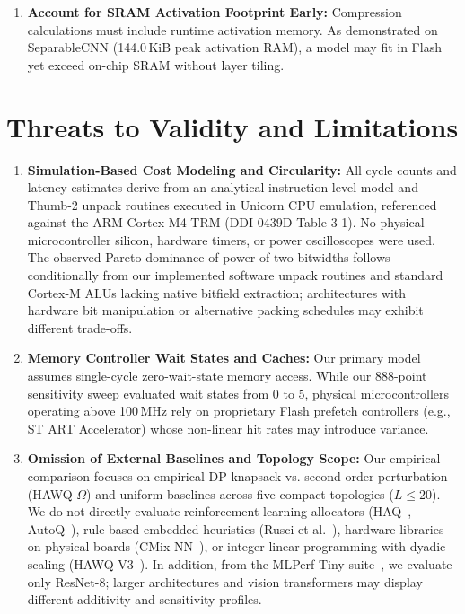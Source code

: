 \documentclass{ieeeaccess}
\begin{document}
\begin{enumerate}
    \item \textbf{Account for SRAM Activation Footprint Early:} Compression calculations must include runtime activation memory. As demonstrated on SeparableCNN (144.0\,KiB peak activation RAM), a model may fit in Flash yet exceed on-chip SRAM without layer tiling.
\end{enumerate}

\section{Threats to Validity and Limitations}
\label{sec:threats}
\begin{enumerate}
    \item \textbf{Simulation-Based Cost Modeling and Circularity:} All cycle counts and latency estimates derive from an analytical instruction-level model and Thumb-2 unpack routines executed in Unicorn CPU emulation, referenced against the ARM Cortex-M4 TRM (DDI 0439D Table 3-1). No physical microcontroller silicon, hardware timers, or power oscilloscopes were used. The observed Pareto dominance of power-of-two bitwidths follows conditionally from our implemented software unpack routines and standard Cortex-M ALUs lacking native bitfield extraction; architectures with hardware bit manipulation or alternative packing schedules may exhibit different trade-offs.
    \item \textbf{Memory Controller Wait States and Caches:} Our primary model assumes single-cycle zero-wait-state memory access. While our 888-point sensitivity sweep evaluated wait states from 0 to 5, physical microcontrollers operating above 100\,MHz rely on proprietary Flash prefetch controllers (e.g., ST ART Accelerator) whose non-linear hit rates may introduce variance.
    \item \textbf{Omission of External Baselines and Topology Scope:} Our empirical comparison focuses on empirical DP knapsack vs. second-order perturbation (HAWQ-$\Omega$) and uniform baselines across five compact topologies ($L \le 20$). We do not directly evaluate reinforcement learning allocators (HAQ~\cite{wang2019haq}, AutoQ~\cite{lou2020autoq}), rule-based embedded heuristics (Rusci et al.~\cite{rusci2020quantization}), hardware libraries on physical boards (CMix-NN~\cite{capotondi2020cmixnn}), or integer linear programming with dyadic scaling (HAWQ-V3~\cite{yao2021hawqv3}). In addition, from the MLPerf Tiny suite~\cite{banbury2021mlperftiny}, we evaluate only ResNet-8; larger architectures and vision transformers may display different additivity and sensitivity profiles.
\end{enumerate}
\end{document}
